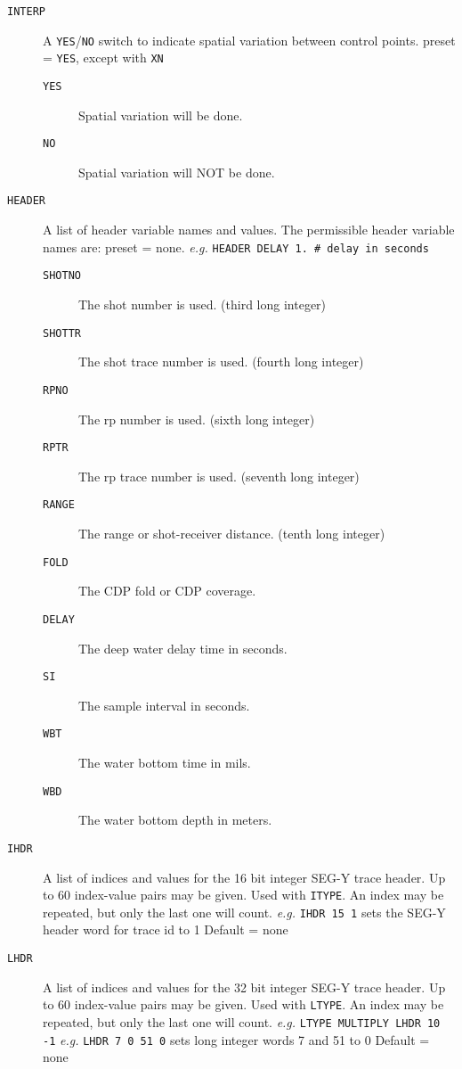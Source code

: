 \begin{description}
\item[\texttt{INTERP}] A \texttt{YES}/\texttt{NO} switch to indicate spatial variation between control
         points.
         \Gls{preset} = \texttt{YES}, except with \texttt{XN}
\begin{description}
\item[\texttt{YES}] Spatial variation will be done.
\item[\texttt{NO}] Spatial variation will NOT be done.
\end{description}

\item[\texttt{HEADER}] A list of header variable names and values.  The permissible
         header variable names are:
         \Gls{preset} = none.   \textit{e.g.} \texttt{HEADER DELAY 1.   \# delay in seconds}
\begin{description}
\item[\texttt{SHOTNO}]  The \gls{shot} number is used. (third long integer)
\item[\texttt{SHOTTR}]  The \gls{shot} trace number is used. (fourth long integer)
\item[\texttt{RPNO}]    The \gls{rp} number is used. (sixth long integer)
\item[\texttt{RPTR}]    The \gls{rp} trace number is used. (seventh long integer)
\item[\texttt{RANGE}]   The range or shot-receiver distance. (tenth long integer)
\item[\texttt{FOLD}]    The CDP fold or CDP coverage.
\item[\texttt{DELAY}]   The deep water delay time in seconds.
\item[\texttt{SI}]      The sample interval in seconds.
\item[\texttt{WBT}]     The water bottom time in mils.
\item[\texttt{WBD}]     The water bottom depth in meters.
\end{description}

\item[\texttt{IHDR}] A list of indices and values for the 16 bit integer SEG-Y trace
         header.  Up to 60 index-value pairs may be given.  Used with \texttt{ITYPE}.
         An index may be repeated, but only the last one will count.
         \textit{e.g.} \texttt{IHDR 15 1} sets the SEG-Y header word for trace id to 1
         Default = none

\item[\texttt{LHDR}] A list of indices and values for the 32 bit integer SEG-Y trace
         header.  Up to 60 index-value pairs may be given. Used with \texttt{LTYPE}.
         An index may be repeated, but only the last one will count.
         \textit{e.g.}   \texttt{LTYPE MULTIPLY LHDR 10 -1}
         \textit{e.g.}  \texttt{LHDR 7 0 51 0}    sets long integer words 7 and 51 to 0
         Default = none


\end{description}
